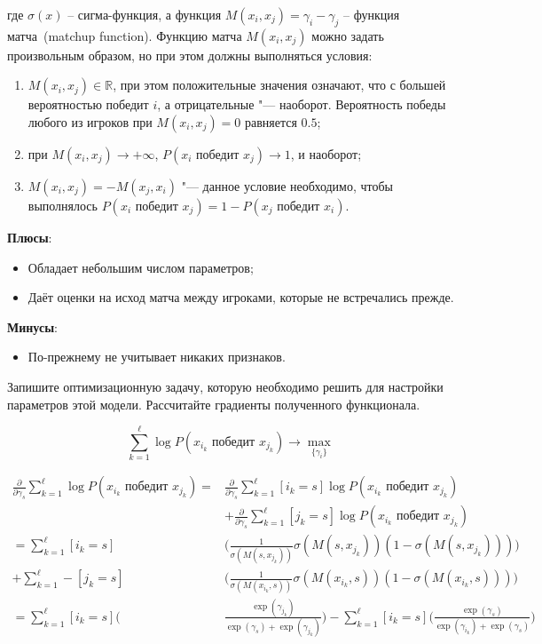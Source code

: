 \documentclass[12pt,a4paper]{article}
\begin{document}
где $\sigma(x)$ – сигма-функция, а функция $M(x_i,x_j) = \gamma_i - \gamma_j$ – функция матча~(matchup function). Функцию матча $M(x_i, x_j)$ можно задать произвольным образом, но при этом должны выполняться условия:

\begin{enumerate}
	\item $M(x_i, x_j) \in \mathbb{R}$, при этом положительные значения означают, что с большей вероятностью победит $i$, а отрицательные "--- наоборот. Вероятность победы любого из игроков при $M(x_i, x_j) = 0$ равняется $0.5$;
	\item при $M(x_i, x_j) \to +\infty$, $P(x_i \text{ победит } x_j) \to 1$, и наоборот;
	\item $M(x_i, x_j) = - M(x_j, x_i)$ "--- данное условие необходимо, чтобы выполнялось $P(x_i \text{ победит } x_j) = 1 - P(x_j \text{ победит } x_i)$.
\end{enumerate}

\textbf{Плюсы}:
\begin{itemize}
	\item Обладает небольшим числом параметров;
	\item Даёт оценки на исход матча между игроками, которые не встречались прежде.
\end{itemize}

\textbf{Минусы}:
\begin{itemize}
	\item По-прежнему не учитывает никаких признаков.
\end{itemize}

\begin{vkProblem}
	Запишите оптимизационную задачу, которую необходимо решить для настройки параметров этой модели. Рассчитайте градиенты полученного функционала.
\end{vkProblem}
\begin{esSolution}
	\begin{equation*}
		\sum_{k=1}^\ell \log P(x_{i_k} \text{ победит } x_{j_k}) \to \max_{\{\gamma_i\}}
	\end{equation*}
	
	\begin{align*}
		\frac{\partial}{\partial \gamma_s} \sum_{k=1}^\ell \log P(x_{i_k} \text{ победит } x_{j_k}) = & \frac{\partial}{\partial \gamma_s} \sum_{k=1}^\ell [i_k = s]\log P(x_{i_k} \text{ победит } x_{j_k})\\ 
		& + \frac{\partial}{\partial \gamma_s} \sum_{k=1}^\ell [j_k = s]\log P(x_{i_k} \text{ победит } x_{j_k})\\
		= \sum_{k=1}^\ell [i_k=s] &\bigg(\frac{1}{\sigma(M(s, x_{j_k}))} \sigma(M(s, x_{j_k})) ( 1 - \sigma(M(s, x_{j_k}))) \bigg)\\
		+ \sum_{k=1}^\ell -[j_k =s] &\bigg(\frac{1}{\sigma(M(x_{i_k}, s))} \sigma(M(x_{i_k}, s)) ( 1 - \sigma(M(x_{i_k}, s)))\bigg)\\
		= \sum_{k=1}^\ell [i_k=s] \bigg( &\frac{\exp(\gamma_{j_k})}{\exp(\gamma_s) + \exp(\gamma_{j_k})} \bigg) - \sum_{k=1}^\ell [i_k=s] \bigg( \frac{\exp(\gamma_s)}{\exp(\gamma_{i_k}) + \exp(\gamma_s)} \bigg)
	\end{align*}
\end{esSolution}
\end{document}
